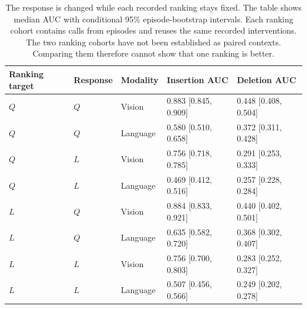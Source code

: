 \begin{table}[htbp]
\centering\small
\setlength{\tabcolsep}{3.5pt}
\caption{The response is changed while each recorded ranking stays fixed. The table shows median AUC with conditional 95\% episode-bootstrap intervals. Each ranking cohort contains \RescoreCalls{} calls from \RescoreEpisodes{} episodes and reuses the same recorded interventions. The two ranking cohorts have not been established as paired contexts. Comparing them therefore cannot show that one ranking is better.}
\label{tab:targets}
\begin{tabular}{lllll}
\toprule
Ranking target & Response & Modality & Insertion AUC & Deletion AUC \\
\midrule
$Q$ & $Q$ & Vision & 0.883 [0.845, 0.909] & 0.448 [0.408, 0.504] \\
$Q$ & $Q$ & Language & 0.580 [0.510, 0.658] & 0.372 [0.311, 0.428] \\
$Q$ & $L$ & Vision & 0.756 [0.718, 0.785] & 0.291 [0.253, 0.333] \\
$Q$ & $L$ & Language & 0.469 [0.412, 0.516] & 0.257 [0.228, 0.284] \\
$L$ & $Q$ & Vision & 0.884 [0.833, 0.921] & 0.440 [0.402, 0.501] \\
$L$ & $Q$ & Language & 0.635 [0.582, 0.720] & 0.368 [0.302, 0.407] \\
$L$ & $L$ & Vision & 0.756 [0.700, 0.803] & 0.283 [0.252, 0.327] \\
$L$ & $L$ & Language & 0.507 [0.456, 0.566] & 0.249 [0.202, 0.278] \\
\bottomrule
\end{tabular}
\end{table}
